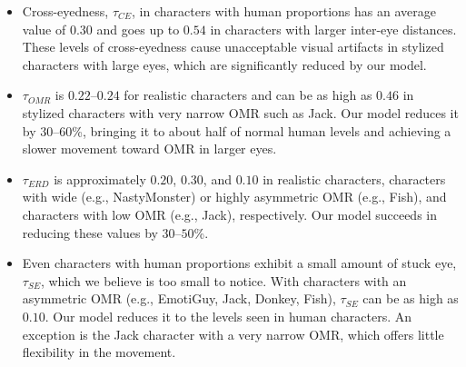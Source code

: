 \begin{itemize}
\item Cross-eyedness, $\tau_{CE}$, in characters with human proportions has an average value of $0.30$ and goes up to $0.54$ in characters with larger inter-eye distances. These levels of cross-eyedness cause unacceptable visual artifacts in stylized characters with large eyes, which are significantly reduced by our model.
\item $\tau_{OMR}$ is $0.22$--$0.24$ for realistic characters and can be as high as $0.46$ in stylized characters with very narrow OMR such as Jack. Our model reduces it by $30$--$60$\%, bringing it to about half of normal human levels and achieving a slower movement toward OMR in larger eyes.
\item $\tau_{ERD}$ is approximately $0.20$, $0.30$, and $0.10$ in realistic characters, characters with wide (e.g., NastyMonster) or highly asymmetric OMR (e.g., Fish), and characters with low OMR (e.g., Jack), respectively. Our model succeeds in reducing these values by $30$--$50$\%.
\item Even characters with human proportions exhibit a small amount of stuck eye, $\tau_{SE}$, which we believe is too small to notice. With characters with an asymmetric OMR (e.g., EmotiGuy, Jack, Donkey, Fish), $\tau_{SE}$ can be as high as $0.10$. Our model reduces it to the levels seen in human characters. An exception is the Jack character with a very narrow OMR, which offers little flexibility in the movement.
\end{itemize}
